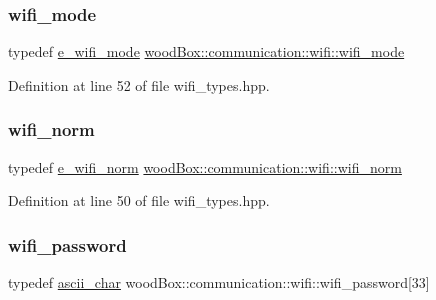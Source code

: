 \subsubsection{\texorpdfstring{wifi\+\_\+mode}{wifi\_mode}}
{\footnotesize\ttfamily typedef \mbox{\hyperlink{namespacewood_box_1_1communication_1_1wifi_a5ad80eaf01cc029d013169340f00267f}{e\+\_\+wifi\+\_\+mode}} \mbox{\hyperlink{namespacewood_box_1_1communication_1_1wifi_a5ad80eaf01cc029d013169340f00267f}{wood\+Box\+::communication\+::wifi\+::wifi\+\_\+mode}}}



Definition at line 52 of file wifi\+\_\+types.\+hpp.

\mbox{\label{namespacewood_box_1_1communication_1_1wifi_ad4c2c5935a896a0062be3098e7aa8cd7}} 
\subsubsection{\texorpdfstring{wifi\+\_\+norm}{wifi\_norm}}
{\footnotesize\ttfamily typedef \mbox{\hyperlink{namespacewood_box_1_1communication_1_1wifi_ad8134bb3fde72db09c3ba7071ed46a24}{e\+\_\+wifi\+\_\+norm}} \mbox{\hyperlink{namespacewood_box_1_1communication_1_1wifi_ad8134bb3fde72db09c3ba7071ed46a24}{wood\+Box\+::communication\+::wifi\+::wifi\+\_\+norm}}}



Definition at line 50 of file wifi\+\_\+types.\+hpp.

\mbox{\label{namespacewood_box_1_1communication_1_1wifi_abb74f42637926c2c61a05dafc57a7ab8}} 
\subsubsection{\texorpdfstring{wifi\+\_\+password}{wifi\_password}}
{\footnotesize\ttfamily typedef \mbox{\hyperlink{namespacewood_box_1_1communication_1_1wifi_a29995934e86031637bb2e0d8192cc467}{ascii\+\_\+char}} wood\+Box\+::communication\+::wifi\+::wifi\+\_\+password\mbox{[}33\mbox{]}}



